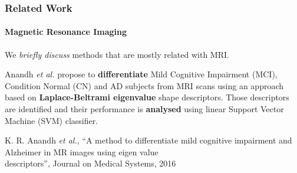 \begin{frame}
	\frametitle{Related Work}
	\framesubtitle{Magnetic Resonance Imaging}
	
	\Large
	
	\vspace{0.55cm}
	
	We \emph{briefly discuss} methods that are mostly related with MRI.
	
	\vspace{0.1cm}
	
	Anandh \emph{et al.} \cite{Anandh16} propose to \textbf{differentiate} Mild Cognitive Impairment
	(MCI), Condition Normal (CN) and AD subjects from MRI scans using an approach based on
	\textbf{Laplace-Beltrami eigenvalue} shape descriptors. Those descriptors are identified and their
	performance is \textbf{analysed} using linear Support Vector Machine (SVM) classifier.
	
	\vspace{0.3cm}
	
	\tiny
	
	\cite{Anandh16} K. R. Anandh \emph{et al.}, ``A method to differentiate mild cognitive impairment and
	Alzheimer in MR images using eigen value\\ \hspace{0.25cm} descriptors'', Journal on Medical Systems,
	2016
\end{frame}
